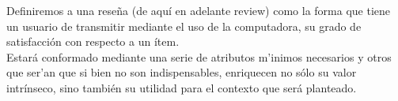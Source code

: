 Definiremos a una reseña (de aquí en adelante review) como la forma que tiene un usuario de transmitir mediante el uso de la computadora, su grado de satisfacción con respecto a un ítem.\\
Estará conformado mediante una serie de atributos m'inimos necesarios y otros que ser'an que si bien no son indispensables, enriquecen no sólo su valor intrínseco, sino también su utilidad para el contexto que será planteado.\\
    
    